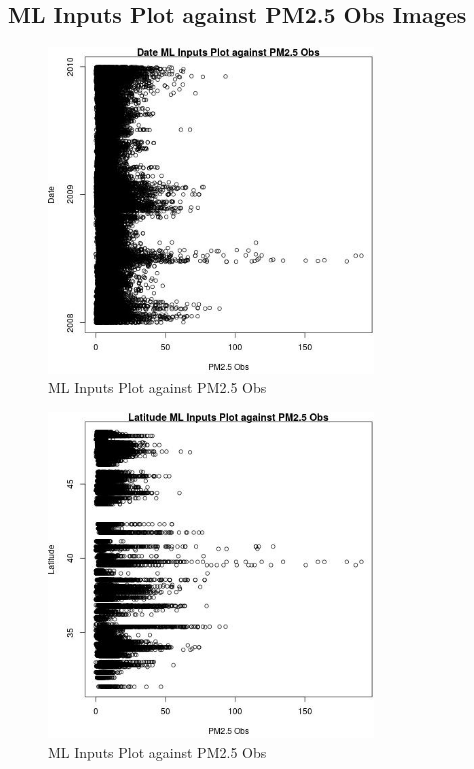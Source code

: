 
\subsection{ML Inputs Plot against PM2.5 Obs Images} 
 

\begin{figure} 
\centering  
\includegraphics[width=0.77\textwidth]{Code_Outputs/Report_ML_input_PM25_Step4_part_e_de_duplicated_aves_DatevPM25_Obs.jpg} 
\caption{\label{fig:Report_ML_input_PM25_Step4_part_e_de_duplicated_avesDatevPM25_Obs}ML Inputs Plot against PM2.5 Obs} 
\end{figure} 
 

\begin{figure} 
\centering  
\includegraphics[width=0.77\textwidth]{Code_Outputs/Report_ML_input_PM25_Step4_part_e_de_duplicated_aves_LatitudevPM25_Obs.jpg} 
\caption{\label{fig:Report_ML_input_PM25_Step4_part_e_de_duplicated_avesLatitudevPM25_Obs}ML Inputs Plot against PM2.5 Obs} 
\end{figure} 
 

